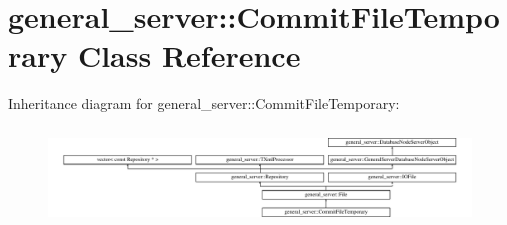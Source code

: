 \hypertarget{classgeneral__server_1_1CommitFileTemporary}{\section{general\-\_\-server\-:\-:\-Commit\-File\-Temporary \-Class \-Reference}
\label{classgeneral__server_1_1CommitFileTemporary}
}
\-Inheritance diagram for general\-\_\-server\-:\-:\-Commit\-File\-Temporary\-:\begin{figure}[H]
\begin{center}
\leavevmode
\includegraphics[height=2.621723cm]{classgeneral__server_1_1CommitFileTemporary}
\end{center}
\end{figure}
